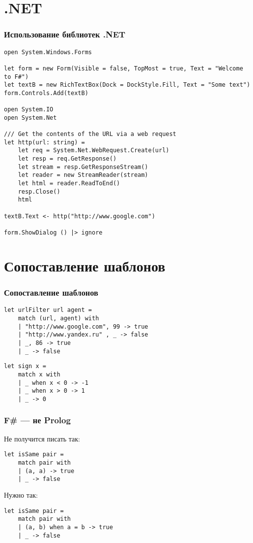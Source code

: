 \documentclass{../../slides-style}
\begin{document}
    \section{.NET}

    \begin{frame}[fragile]
        \frametitle{Использование библиотек .NET}
        \begin{scriptsize}
            \begin{verbatim}
open System.Windows.Forms

let form = new Form(Visible = false, TopMost = true, Text = "Welcome to F#")
let textB = new RichTextBox(Dock = DockStyle.Fill, Text = "Some text")
form.Controls.Add(textB)

open System.IO
open System.Net

/// Get the contents of the URL via a web request
let http(url: string) =
    let req = System.Net.WebRequest.Create(url)
    let resp = req.GetResponse()
    let stream = resp.GetResponseStream()
    let reader = new StreamReader(stream)
    let html = reader.ReadToEnd()
    resp.Close()
    html

textB.Text <- http("http://www.google.com")

form.ShowDialog () |> ignore
            \end{verbatim}
        \end{scriptsize}
    \end{frame}

    \section{Сопоставление шаблонов}
    
    \begin{frame}[fragile]
        \frametitle{Сопоставление шаблонов}
        \begin{verbatim}
let urlFilter url agent =
    match (url, agent) with
    | "http://www.google.com", 99 -> true
    | "http://www.yandex.ru" , _ -> false
    | _, 86 -> true
    | _ -> false
        \end{verbatim}

        \begin{verbatim}
let sign x =
    match x with
    | _ when x < 0 -> -1
    | _ when x > 0 -> 1
    | _ -> 0
        \end{verbatim}
    \end{frame}

    \begin{frame}[fragile]
        \frametitle{F\# --- не Prolog}
        Не получится писать так:
        \begin{verbatim}
let isSame pair =
    match pair with
    | (a, a) -> true
    | _ -> false
        \end{verbatim}
        Нужно так:
        \begin{verbatim}
let isSame pair =
    match pair with
    | (a, b) when a = b -> true
    | _ -> false
        \end{verbatim}
    \end{frame}
\end{document}
